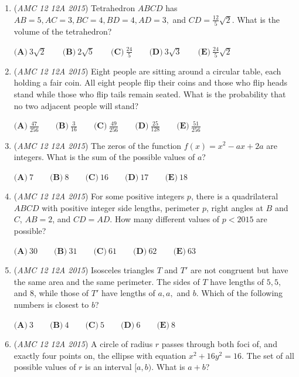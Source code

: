 \begin{enumerate}
 $\textbf{(A)}\ 4\qquad\textbf{(B)}\ 22\qquad\textbf{(C)}\ 26\qquad\textbf{(D)}\ 30\qquad\textbf{(E)}\ 104$


	\item (\textit{AMC 12 12A 2015}) Tetrahedron $ABCD$ has $AB=5,AC=3,BC=4,BD=4,AD=3,$ and $CD=\frac{12}{5}\sqrt{2}$. What is the volume of the tetrahedron?


 $\textbf{(A)}\ 3\sqrt{2}\qquad\textbf{(B)}\ 2\sqrt{5}\qquad\textbf{(C)}\ \frac{24}{5}\qquad\textbf{(D)}\ 3\sqrt{3}\qquad\textbf{(E)}\ \frac{24}{5}\sqrt{2}$


	\item (\textit{AMC 12 12A 2015}) Eight people are sitting around a circular table, each holding a fair coin. All eight people flip their coins and those who flip heads stand while those who flip tails remain seated. What is the probability that no two adjacent people will stand?


 $\textbf{(A)}\ \frac{47}{256} \qquad\textbf{(B)}\ \frac{3}{16} \qquad\textbf{(C)}\ \frac{49}{256} \qquad\textbf{(D)}\ \frac{25}{128} \qquad\textbf{(E)}\ \frac{51}{256}$


	\item (\textit{AMC 12 12A 2015}) The zeros of the function $f(x) = x^2-ax+2a$ are integers. What is the sum of the possible values of $a$?


 $\textbf{(A)}\ 7 \qquad\textbf{(B)}\ 8 \qquad\textbf{(C)}\ 16 \qquad\textbf{(D)}\ 17 \qquad\textbf{(E)}\ 18$


	\item (\textit{AMC 12 12A 2015}) For some positive integers $p$, there is a quadrilateral $ABCD$ with positive integer side lengths, perimeter $p$, right angles at $B$ and $C$, $AB=2$, and $CD=AD$. How many different values of $p<2015$ are possible?


 $\textbf{(A)}\ 30 \qquad\textbf{(B)}\ 31 \qquad\textbf{(C)}\ 61 \qquad\textbf{(D)}\ 62 \qquad\textbf{(E)}\ 63$


	\item (\textit{AMC 12 12A 2015}) Isosceles triangles $T$ and $T'$ are not congruent but have the same area and the same perimeter. The sides of $T$ have lengths of $5,5,$ and $8$, while those of $T'$ have lengths of $a,a,$ and $b$. Which of the following numbers is closest to $b$?


 $\textbf{(A)}\ 3 \qquad\textbf{(B)}\ 4 \qquad\textbf{(C)}\ 5 \qquad\textbf{(D)}\ 6 \qquad\textbf{(E)}\ 8$


	\item (\textit{AMC 12 12A 2015}) A circle of radius $r$ passes through both foci of, and exactly four points on, the ellipse with equation $x^2+16y^2=16$. The set of all possible values of $r$ is an interval $[a,b)$. What is $a+b$?



\end{enumerate}

